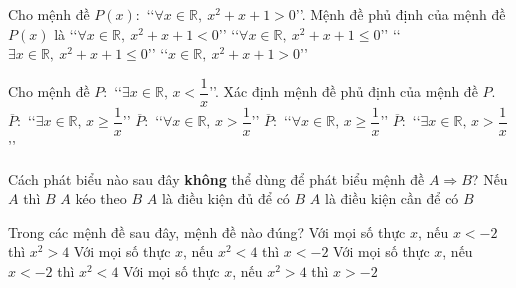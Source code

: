\begin{ex}%
	Cho mệnh đề $P(x)\colon$ \lq\lq $\forall x\in \mathbb{R},\ x^2+x+1>0$\rq\rq. Mệnh đề phủ định của mệnh đề $P(x)$ là
	\choice
	{\lq\lq $\forall x\in \mathbb{R},\ x^2+x+1<0$\rq\rq}
	{\lq\lq $\forall x\in \mathbb{R},\ x^2+x+1\leqslant 0$\rq\rq}
	{\True \lq\lq $\exists x\in \mathbb{R},\ x^2+x+1\leqslant 0$\rq\rq}
	{\lq\lq $x\in \mathbb{R},\ x^2+x+1>0$\rq\rq}
\end{ex}
\begin{ex}%
	Cho mệnh đề $P\colon$ \lq\lq $\exists x\in \mathbb{R},\, x<\dfrac{1}{x}$\rq\rq. Xác định mệnh đề phủ định của mệnh đề $P$.
	\choice
	{$\overline{P}\colon$ \lq\lq  $\exists x\in \mathbb{R},\, x\ge \dfrac{1}{x}$\rq\rq}
	{$\overline{P}\colon$ \lq\lq  $\forall x\in \mathbb{R},\, x> \dfrac{1}{x}$\rq\rq}
	{\True 	$\overline{P}\colon$ \lq\lq  $\forall x\in \mathbb{R},\, x\ge \dfrac{1}{x}$\rq\rq}
	{$\overline{P}\colon$ \lq\lq  $\exists x\in \mathbb{R},\, x> \dfrac{1}{x}$\rq\rq}
\end{ex}
\begin{ex}%
	Cách phát biểu nào sau đây \textbf{không} thể dùng để phát biểu mệnh đề $A \Rightarrow B$?
	\choice
	{Nếu $A$ thì $B$}
	{$A$ kéo theo $B$}
	{$A$ là điều kiện đủ để có $B$}
	{\True $A$ là điều kiện cần để có $B$}
\end{ex}
\begin{ex}%
	Trong các mệnh đề sau đây, mệnh đề nào đúng?
	\choice
	{\True Với mọi số thực $x$, nếu $x <-2$ thì $x^2> 4$}
	{Với mọi số thực $x$, nếu $x^2< 4$ thì $x <-2$}
	{Với mọi số thực $x$, nếu $x <-2$ thì $x^2< 4$}
	{Với mọi số thực $x$, nếu $x^2> 4$ thì $x >-2$}
\end{ex}
